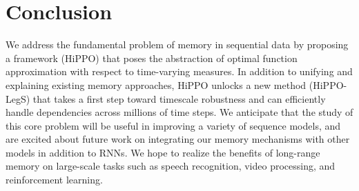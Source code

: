 
\section{Conclusion}
\label{sec:conclusion}

We address the fundamental problem of memory in
sequential data by proposing a framework (HiPPO) that poses the abstraction
of optimal function approximation with respect to time-varying measures.
In addition to unifying and explaining existing memory approaches,
HiPPO unlocks a new method (HiPPO-LegS) that takes a first step toward timescale robustness
and can efficiently handle dependencies across millions of time steps.
We anticipate that the study of this core problem
will be useful in improving a variety of sequence models,
and are excited about future work on integrating our memory mechanisms with other models in addition to RNNs.
We hope to realize the benefits of long-range memory on large-scale tasks such
as speech recognition, video processing, and reinforcement learning.





